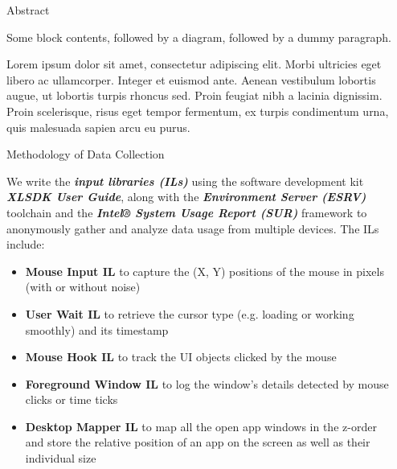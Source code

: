 \documentclass[final]{beamer}
\newlength{\sepwidth}
\newlength{\colwidth}
\newcommand{\separatorcolumn}{\begin{column}{\sepwidth}\end{column}}
\begin{document}
\begin{frame}[t]
\begin{columns}[t]
\separatorcolumn

\begin{column}{\colwidth}

  \begin{block}{Abstract}

    Some block contents, followed by a diagram, followed by a dummy paragraph.

    Lorem ipsum dolor sit amet, consectetur adipiscing elit. Morbi ultricies
    eget libero ac ullamcorper. Integer et euismod ante. Aenean vestibulum
    lobortis augue, ut lobortis turpis rhoncus sed. Proin feugiat nibh a
    lacinia dignissim. Proin scelerisque, risus eget tempor fermentum, ex
    turpis condimentum urna, quis malesuada sapien arcu eu purus.

  \end{block}

    \begin{alertblock}{Methodology of Data Collection}

    We write the \textbf{\textit{input libraries (ILs)}} using the  software development kit \textbf{\textit{XLSDK User Guide}}, along with the \textbf{\textit{Environment Server (ESRV)}}  toolchain  and the \textit{ \textbf{Intel® System Usage Report  (SUR)}} framework to anonymously gather and analyze data usage from multiple devices. The ILs include: 

    \begin{itemize}
      \item \textbf{Mouse Input IL}  to capture the (X, Y) positions of the mouse in pixels (with or without noise)

      \item \textbf{User Wait IL} to retrieve the cursor type (e.g. loading or working smoothly) and its timestamp 

      \item \textbf{Mouse Hook IL} to track the UI objects clicked by the mouse

      \item \textbf{Foreground Window IL} to log the window's details detected by mouse clicks or time ticks

      \item \textbf{Desktop Mapper IL} to map all the open app windows in the z-order and store the relative position of an app on the screen as well as their individual size


\end{itemize}
\end{alertblock}
\end{column}
\end{columns}
\end{frame}
\end{document}
